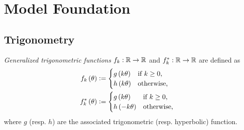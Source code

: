 \documentclass[../main.tex]{subfiles}
\begin{document}
\section{Model Foundation}
\subsection{Trigonometry}
\begin{definition}\label{M:Trigonometry}
    \textit{Generalized trigonometric functions} $f_k:\mathbb{R}\to\mathbb{R}$ and $f_k^\ast:\mathbb{R}\to\mathbb{R}$ are defined as
    \begin{align*}
        f_k\left(\theta\right)      & \vcentcolon=
        \begin{cases}
            g\left(k\theta\right) & \text{if $k\geq0$,} \\
            h\left(k\theta\right) & \text{otherwise,}   \\
        \end{cases} \\
        f_k^\ast\left(\theta\right) & \vcentcolon=
        \begin{cases}
            g\left(k\theta\right)  & \text{if $k\geq0$,} \\
            h\left(-k\theta\right) & \text{otherwise,}   \\
        \end{cases}
    \end{align*}
    where $g$ (resp. $h$) are the associated trigonometric (resp. hyperbolic) function.
\end{definition}
\end{document}
